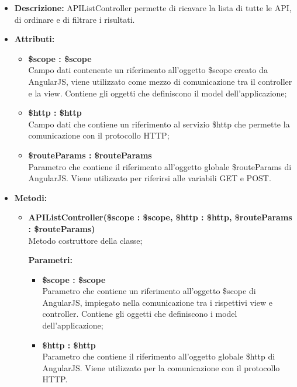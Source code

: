\begin{itemize}
	\item \textbf{Descrizione:} APIListController permette di ricavare la lista di tutte le API, di ordinare e di filtrare i risultati.
	\item \textbf{Attributi:}
	\begin{itemize}
		
		\item \textbf{\$scope : \$scope}\\
		Campo dati contenente un riferimento all'oggetto \$scope creato da AngularJS, viene utilizzato come mezzo di comunicazione tra il controller e la view. Contiene gli oggetti che definiscono il model dell'applicazione;
		
		\item \textbf{\$http : \$http }\\
		Campo dati che contiene un riferimento al servizio \$http che permette la comunicazione con il protocollo HTTP;
		
		\item \textbf{\$routeParams : \$routeParams}\\
		Parametro che contiene il riferimento all'oggetto globale \$routeParams di AngularJS. Viene utilizzato per riferirsi alle variabili GET e POST.
		
		
	\end{itemize}
	\item \textbf{Metodi:}
	\begin{itemize}
		
		\item \textbf{APIListController(\$scope : \$scope, \$http : \$http, \$routeParams : \$routeParams)}\\
		Metodo costruttore della classe;
		\begin{description}
			\item[\textbf{Parametri:}]
		\end{description}
		\begin{itemize}
			\item \textbf{\$scope : \$scope}\\
			Parametro che contiene un riferimento all'oggetto \$scope di AngularJS, impiegato nella comunicazione tra i rispettivi view e controller. Contiene gli oggetti che definiscono i model dell'applicazione;
			
			\item \textbf{\$http : \$http}\\
			Parametro che contiene il riferimento all'oggetto globale \$http di AngularJS. Viene utilizzato per la comunicazione con il protocollo HTTP.
			

\end{itemize}
\end{itemize}
\end{itemize}
